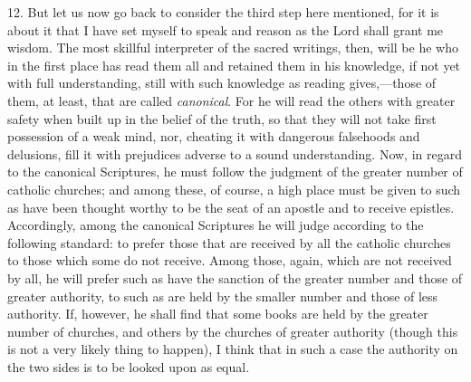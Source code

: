 12. But let us now go back to consider the third step here mentioned, for it is about it that I have set myself to speak and reason as the Lord shall grant me wisdom. The most skillful interpreter of the sacred writings, then, will be he who in the first place has read them all and retained them in his knowledge, if not yet with full understanding, still with such knowledge as reading gives,—those of them, at least, that are called \emph{canonical}. For he will read the others with greater safety when built up in the belief of the truth, so that they will not take first possession of a weak mind, nor, cheating it with dangerous falsehoods and delusions, fill it with prejudices adverse to a sound understanding. Now, in regard to the canonical Scriptures, he must follow the judgment of the greater number of catholic churches; and among these, of course, a high place must be given to such as have been thought worthy to be the seat of an apostle and to receive epistles. Accordingly, among the canonical Scriptures he will judge according to the following standard: to prefer those that are received by all the catholic churches to those which some do not receive. Among those, again, which are not received by all, he will prefer such as have the sanction of the greater number and those of greater authority, to such as are held by the smaller number and those of less authority. If, however, he shall find that some books are held by the greater number of churches, and others by the churches of greater authority (though this is not a very likely thing to happen), I think that in such a case the authority on the two sides is to be looked upon as equal.

